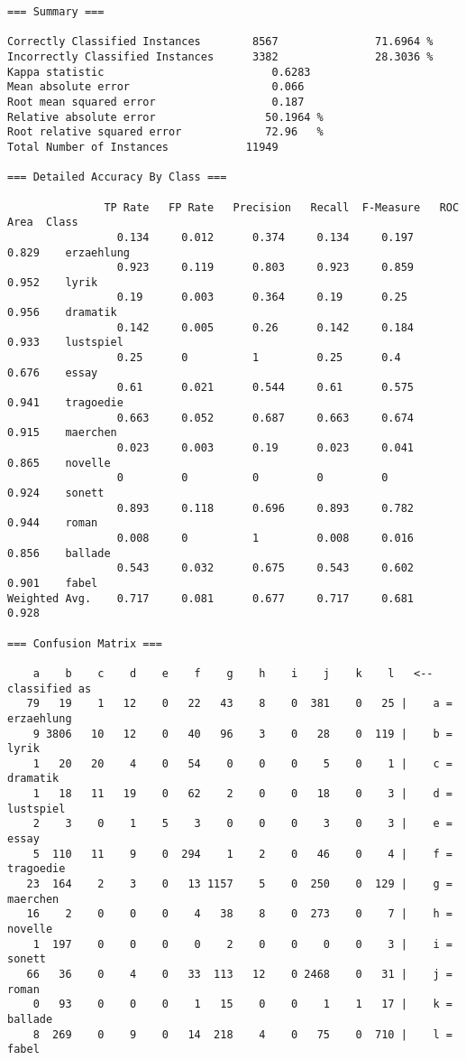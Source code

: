 \documentclass[]{article}
\begin{document}
\begin{small}
\vspace{4 mm}\begin{verbatim}
=== Summary ===

Correctly Classified Instances        8567               71.6964 %
Incorrectly Classified Instances      3382               28.3036 %
Kappa statistic                          0.6283
Mean absolute error                      0.066
Root mean squared error                  0.187
Relative absolute error                 50.1964 %
Root relative squared error             72.96   %
Total Number of Instances            11949     

=== Detailed Accuracy By Class ===

               TP Rate   FP Rate   Precision   Recall  F-Measure   ROC Area  Class
                 0.134     0.012      0.374     0.134     0.197      0.829    erzaehlung
                 0.923     0.119      0.803     0.923     0.859      0.952    lyrik
                 0.19      0.003      0.364     0.19      0.25       0.956    dramatik
                 0.142     0.005      0.26      0.142     0.184      0.933    lustspiel
                 0.25      0          1         0.25      0.4        0.676    essay
                 0.61      0.021      0.544     0.61      0.575      0.941    tragoedie
                 0.663     0.052      0.687     0.663     0.674      0.915    maerchen
                 0.023     0.003      0.19      0.023     0.041      0.865    novelle
                 0         0          0         0         0          0.924    sonett
                 0.893     0.118      0.696     0.893     0.782      0.944    roman
                 0.008     0          1         0.008     0.016      0.856    ballade
                 0.543     0.032      0.675     0.543     0.602      0.901    fabel
Weighted Avg.    0.717     0.081      0.677     0.717     0.681      0.928

=== Confusion Matrix ===

    a    b    c    d    e    f    g    h    i    j    k    l   <-- classified as
   79   19    1   12    0   22   43    8    0  381    0   25 |    a = erzaehlung
    9 3806   10   12    0   40   96    3    0   28    0  119 |    b = lyrik
    1   20   20    4    0   54    0    0    0    5    0    1 |    c = dramatik
    1   18   11   19    0   62    2    0    0   18    0    3 |    d = lustspiel
    2    3    0    1    5    3    0    0    0    3    0    3 |    e = essay
    5  110   11    9    0  294    1    2    0   46    0    4 |    f = tragoedie
   23  164    2    3    0   13 1157    5    0  250    0  129 |    g = maerchen
   16    2    0    0    0    4   38    8    0  273    0    7 |    h = novelle
    1  197    0    0    0    0    2    0    0    0    0    3 |    i = sonett
   66   36    0    4    0   33  113   12    0 2468    0   31 |    j = roman
    0   93    0    0    0    1   15    0    0    1    1   17 |    k = ballade
    8  269    0    9    0   14  218    4    0   75    0  710 |    l = fabel
\end{verbatim}\vspace{4 mm}
\end{small}
\end{document}
